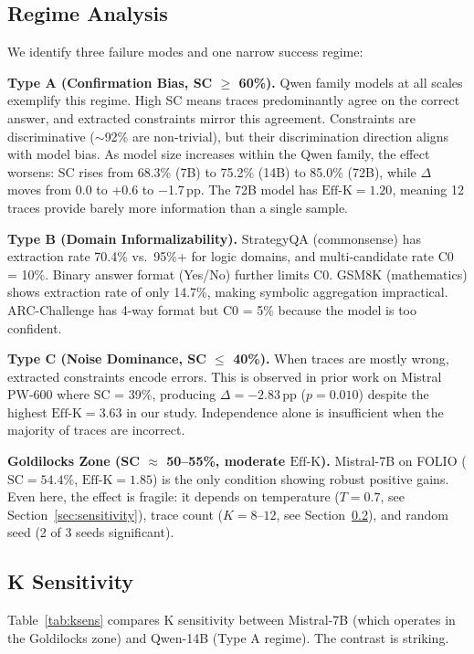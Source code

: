 \documentclass[11pt,a4paper]{article}
\newcommand{\effk}{\text{Eff-K}}
\begin{document}
\subsection{Regime Analysis}
\label{sec:regime}

We identify three failure modes and one narrow success regime:

\textbf{Type A (Confirmation Bias, SC $\geq$ 60\%).} Qwen family models at all scales exemplify this regime. High SC means traces predominantly agree on the correct answer, and extracted constraints mirror this agreement. Constraints are discriminative ($\sim$92\% are non-trivial), but their discrimination direction aligns with model bias. As model size increases within the Qwen family, the effect worsens: SC rises from 68.3\% (7B) to 75.2\% (14B) to 85.0\% (72B), while $\Delta$ moves from 0.0 to +0.6 to $-$1.7\,pp. The 72B model has $\effk = 1.20$, meaning 12 traces provide barely more information than a single sample.

\textbf{Type B (Domain Informalizability).} StrategyQA (commonsense) has extraction rate 70.4\% vs.\ 95\%+ for logic domains, and multi-candidate rate C0 = 10\%. Binary answer format (Yes/No) further limits C0. GSM8K (mathematics) shows extraction rate of only 14.7\%, making symbolic aggregation impractical. ARC-Challenge has 4-way format but C0 = 5\% because the model is too confident.

\textbf{Type C (Noise Dominance, SC $\leq$ 40\%).} When traces are mostly wrong, extracted constraints encode errors. This is observed in prior work on Mistral PW-600 where SC = 39\%, producing $\Delta = -2.83$\,pp ($p = 0.010$) despite the highest $\effk = 3.63$ in our study. Independence alone is insufficient when the majority of traces are incorrect.

\textbf{Goldilocks Zone (SC $\approx$ 50--55\%, moderate $\effk$).} Mistral-7B on FOLIO ($\text{SC} = 54.4\%$, $\effk = 1.85$) is the only condition showing robust positive gains. Even here, the effect is fragile: it depends on temperature ($T=0.7$, see Section~\ref{sec:sensitivity}), trace count ($K=8$--$12$, see Section~\ref{sec:ksens}), and random seed (2 of 3 seeds significant).


\subsection{K Sensitivity}
\label{sec:ksens}

Table~\ref{tab:ksens} compares K sensitivity between Mistral-7B (which operates in the Goldilocks zone) and Qwen-14B (Type A regime). The contrast is striking.
\end{document}
